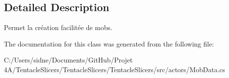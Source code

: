 \subsection{Detailed Description}
Permet la création facilitée de mobs. 



The documentation for this class was generated from the following file\+:\begin{DoxyCompactItemize}
\item 
C\+:/\+Users/sidne/\+Documents/\+Git\+Hub/\+Projet 4\+A/\+Tentacle\+Slicers/\+Tentacle\+Slicers/\+Tentacle\+Slicers/src/actors/Mob\+Data.\+cs\end{DoxyCompactItemize}
